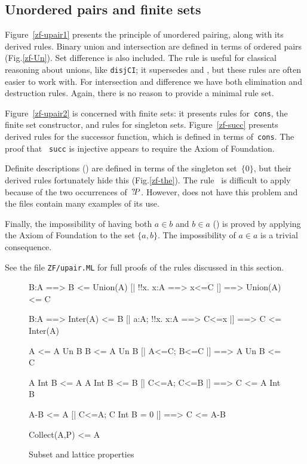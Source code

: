 \subsection{Unordered pairs and finite sets}
Figure~\ref{zf-upair1} presents the principle of unordered pairing, along
with its derived rules.  Binary union and intersection are defined in terms
of ordered pairs (Fig.\ts\ref{zf-Un}).  Set difference is also included.  The
rule  is useful for classical reasoning about unions,
like \texttt{disjCI}\@; it supersedes  and
, but these rules are often easier to work with.  For
intersection and difference we have both elimination and destruction rules.
Again, there is no reason to provide a minimal rule set.

Figure~\ref{zf-upair2} is concerned with finite sets: it presents rules
for~\texttt{cons}, the finite set constructor, and rules for singleton
sets.  Figure~\ref{zf-succ} presents derived rules for the successor
function, which is defined in terms of~\texttt{cons}.  The proof that {\tt
  succ} is injective appears to require the Axiom of Foundation.

Definite descriptions () are defined in terms of the singleton
set~$\{0\}$, but their derived rules fortunately hide this
(Fig.\ts\ref{zf-the}).  The rule~ is difficult to apply
because of the two occurrences of~${?\!P}$.  However,
 does not have this problem and the files contain
many examples of its use.

Finally, the impossibility of having both $a\in b$ and $b\in a$
() is proved by applying the Axiom of Foundation to
the set $\{a,b\}$.  The impossibility of $a\in a$ is a trivial consequence.

See the file \texttt{ZF/upair.ML} for full proofs of the rules discussed in
this section.



\begin{figure}
\begin{ttbox}
       B:A ==> B <= Union(A)
       [| !!x. x:A ==> x<=C |] ==> Union(A) <= C

       B:A ==> Inter(A) <= B
    [| a:A;  !!x. x:A ==> C<=x |] ==> C <= Inter(A)

         A <= A Un B
         B <= A Un B
          [| A<=C;  B<=C |] ==> A Un B <= C

        A Int B <= A
        A Int B <= B
      [| C<=A;  C<=B |] ==> C <= A Int B

       A-B <= A
     [| C<=A;  C Int B = 0 |] ==> C <= A-B

    Collect(A,P) <= A
\end{ttbox}
\caption{Subset and lattice properties} \label{zf-subset}
\end{figure}


